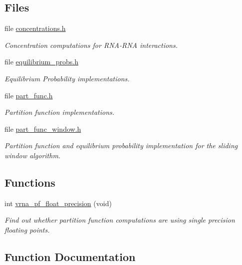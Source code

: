 \subsection*{Files}
\begin{DoxyCompactItemize}
\item 
file \hyperlink{concentrations_8h}{concentrations.\+h}
\begin{DoxyCompactList}\small\item\em Concentration computations for R\+N\+A-\/\+R\+NA interactions. \end{DoxyCompactList}\item 
file \hyperlink{equilibrium__probs_8h}{equilibrium\+\_\+probs.\+h}
\begin{DoxyCompactList}\small\item\em Equilibrium Probability implementations. \end{DoxyCompactList}\item 
file \hyperlink{part__func_8h}{part\+\_\+func.\+h}
\begin{DoxyCompactList}\small\item\em Partition function implementations. \end{DoxyCompactList}\item 
file \hyperlink{part__func__window_8h}{part\+\_\+func\+\_\+window.\+h}
\begin{DoxyCompactList}\small\item\em Partition function and equilibrium probability implementation for the sliding window algorithm. \end{DoxyCompactList}\end{DoxyCompactItemize}
\subsection*{Functions}
\begin{DoxyCompactItemize}
\item 
int \hyperlink{group__pf__fold_gad2b3594f0b50b68029e0f54fdce59313}{vrna\+\_\+pf\+\_\+float\+\_\+precision} (void)
\begin{DoxyCompactList}\small\item\em Find out whether partition function computations are using single precision floating points. \end{DoxyCompactList}\end{DoxyCompactItemize}


\subsection{Function Documentation}
\mbox{\label{group__pf__fold_gad2b3594f0b50b68029e0f54fdce59313}} 
